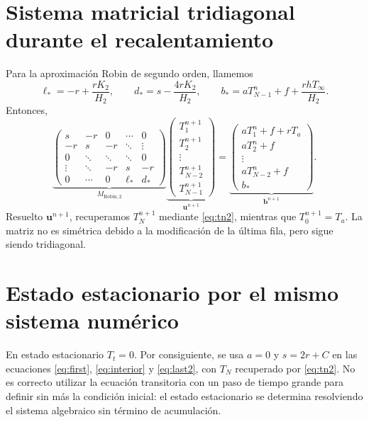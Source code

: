 \documentclass[11pt,a4paper]{article}
\begin{document}
\section{Sistema matricial tridiagonal durante el recalentamiento}
Para la aproximación Robin de segundo orden, llamemos
\begin{equation}
\ell_*=-r+\frac{rK_2}{H_2},\qquad d_*=s-\frac{4rK_2}{H_2},\qquad b_*=aT_{N-1}^n+f+\frac{rhT_\infty}{H_2}.
\end{equation}
Entonces,
\begin{equation}\label{eq:matrix}
\underbrace{\begin{pmatrix}
s&-r&0&\cdots&0\\
-r&s&-r&\ddots&\vdots\\
0&\ddots&\ddots&\ddots&0\\
\vdots&\ddots&-r&s&-r\\
0&\cdots&0&\ell_*&d_*
\end{pmatrix}}_{M_{\mathrm{Robin},2}}
\underbrace{\begin{pmatrix}T_1^{n+1}\\T_2^{n+1}\\\vdots\\T_{N-2}^{n+1}\\T_{N-1}^{n+1}\end{pmatrix}}_{\boldsymbol u^{n+1}}
=\underbrace{\begin{pmatrix}
aT_1^n+f+rT_a\\aT_2^n+f\\\vdots\\aT_{N-2}^n+f\\b_*
\end{pmatrix}}_{\boldsymbol b^{n+1}}.
\end{equation}
Resuelto $\boldsymbol u^{n+1}$, recuperamos $T_N^{n+1}$ mediante \eqref{eq:tn2}, mientras que $T_0^{n+1}=T_a$. La matriz no es simétrica debido a la modificación de la última fila, pero sigue siendo tridiagonal.

\section{Estado estacionario por el mismo sistema numérico}
En estado estacionario $T_t=0$. Por consiguiente, se usa $a=0$ y $s=2r+C$ en las ecuaciones \eqref{eq:first}, \eqref{eq:interior} y \eqref{eq:last2}, con $T_N$ recuperado por \eqref{eq:tn2}. No es correcto utilizar la ecuación transitoria con un paso de tiempo grande para definir sin más la condición inicial: el estado estacionario se determina resolviendo el sistema algebraico sin término de acumulación.
\end{document}
